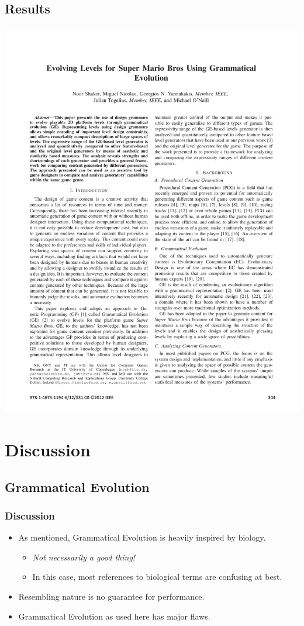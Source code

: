 \documentclass{beamer}
\makeatletter
\newcommand*{\currentname}{\@currentlabelname}
\makeatother
\begin{document}
\subsection{Results}
\begin{frame}
\frametitle{\currentname}
\includegraphics[page=5, trim={11cm 15.5cm 1.5cm 8cm}, clip, scale=1.1]{Mario_GE.pdf}
\end{frame}



\section{Discussion}
\subsection{Grammatical Evolution}
\begin{frame}
\frametitle{Discussion}
\begin{itemize}
\item As mentioned, Grammatical Evolution is heavily inspired by biology.
\begin{itemize}
\item \textit{Not necessarily a good thing!}
\item In this case, most references to biological terms are confusing at best.
\end{itemize}
\item Resembling nature is no guarantee for performance.
\item Grammatical Evolution as used here has major flaws.
\end{itemize}
\end{frame}
\end{document}
